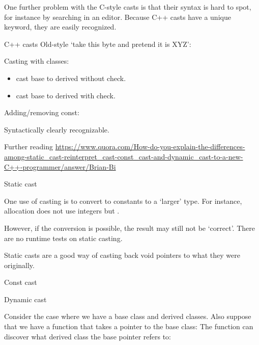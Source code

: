 \begin{remark}
  One further problem with the C-style casts is that their syntax is
  hard to spot, for instance by searching in an editor.
  Because C++ casts have a unique keyword, they are easily recognized.
\end{remark}

\begin{slide}{C++ casts}
  \label{sl:cpp-casts}
  Old-style `take this byte and pretend it is XYZ':
  
  Casting with classes:
  \begin{itemize}
  \item {} cast base to derived without check.
  \item {} cast base to derived with check.
  \end{itemize}
  Adding/removing const: 

  Syntactically clearly recognizable.
\end{slide}

Further reading \url{https://www.quora.com/How-do-you-explain-the-differences-among-static_cast-reinterpret_cast-const_cast-and-dynamic_cast-to-a-new-C++-programmer/answer/Brian-Bi}

 {Static cast}

One use of casting is to convert to constants to a `larger' type. For
instance, allocation does not use integers but .


However, if the
conversion is possible, the result may still not be `correct'.
%
%
There are no runtime tests on static casting.

Static casts are a good way of casting back void pointers to what they
were originally.

\begin{slide}{Const cast}
  \label{sl:const-cast}
\end{slide}

 {Dynamic cast}

Consider the case where we have a base class and derived classes.
%
%
Also suppose that we have a function that takes a pointer to the base
class:
%
%
The function can discover what derived class the base pointer refers
to:
%

